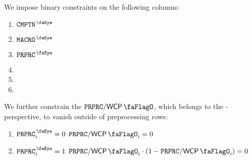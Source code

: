 We impose binary constraints on the following columns:
\begin{multicols}{2}
	\begin{enumerate}
		\item $\isComputation$
		\item $\isMacro$
		\item $\isPreprocessing$
		\item \isExpLog{}
		\item \isModexpLog{}
		\item[\vspace{\fill}]
	\end{enumerate}
\end{multicols}
We further constrain the $\ppWcpFlag$, which belongs to the \isPreprocessing{}-perspective, to vanish outside of preprocessing rows:
\begin{enumerate}[resume]
        \item \If $\isPreprocessing_{i} = 0$ \Then $\ppWcpFlag_{i} = 0$
	\item \If $\isPreprocessing_{i} = 1$ \Then $\ppWcpFlag_{i} \cdot (1 - \ppWcpFlag_{i}) = 0$
\end{enumerate}
